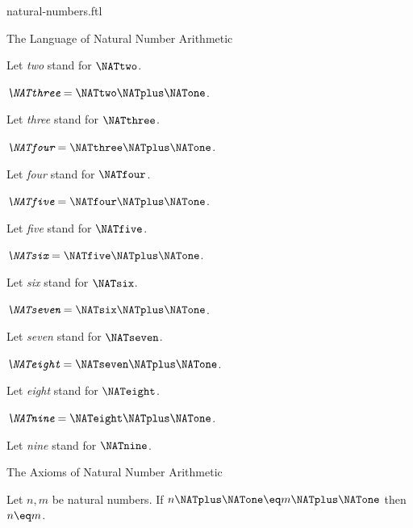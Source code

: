 \documentclass{naproche-library}
\begin{document}
\begin{smodule}[title=Natural Numbers]{natural-numbers.ftl}
\begin{sfragment}{The Language of Natural Number Arithmetic}
\begin{definition}[forthel,id=ARITHMETIC_01_4584236572999680]
    Let \emph{two} stand for $\NATtwo$.
  \end{definition}

  \begin{definition}[forthel,id=ARITHMETIC_01_3836725109456896]
    $\emph{\NATthree} = \NATtwo \NATplus \NATone$.

    Let \emph{three} stand for $\NATthree$.
  \end{definition}

  \begin{definition}[forthel,id=ARITHMETIC_01_1709884968009728]
    $\emph{\NATfour} = \NATthree \NATplus \NATone$.

    Let \emph{four} stand for $\NATfour$.
  \end{definition}

  \begin{definition}[forthel,id=ARITHMETIC_01_6734726333202432]
    $\emph{\NATfive} = \NATfour \NATplus \NATone$.

    Let \emph{five} stand for $\NATfive$.
  \end{definition}

  \begin{definition}[forthel,id=ARITHMETIC_01_949139189792768]
    $\emph{\NATsix} = \NATfive \NATplus \NATone$.

    Let \emph{six} stand for $\NATsix$.
  \end{definition}

  \begin{definition}[forthel,id=ARITHMETIC_01_7245471749767168]
    $\emph{\NATseven} = \NATsix \NATplus \NATone$.

    Let \emph{seven} stand for $\NATseven$.
  \end{definition}

  \begin{definition}[forthel,id=ARITHMETIC_01_5658172888973312]
    $\emph{\NATeight} = \NATseven \NATplus \NATone$.

    Let \emph{eight} stand for $\NATeight$.
  \end{definition}

  \begin{definition}[forthel,id=ARITHMETIC_01_7371844250238976]
    $\emph{\NATnine} = \NATeight \NATplus \NATone$.

    Let \emph{nine} stand for $\NATnine$.
  \end{definition}
\end{sfragment}

\begin{sfragment}{The Axioms of Natural Number Arithmetic}
  \begin{axiom}[forthel,id=ARITHMETIC_01_3604163883696128]
    Let $n, m$ be natural numbers.
    If $n \NATplus \NATone \eq m \NATplus \NATone$ then $n \eq m$.
  \end{axiom}


\end{sfragment}
\end{smodule}
\end{document}
